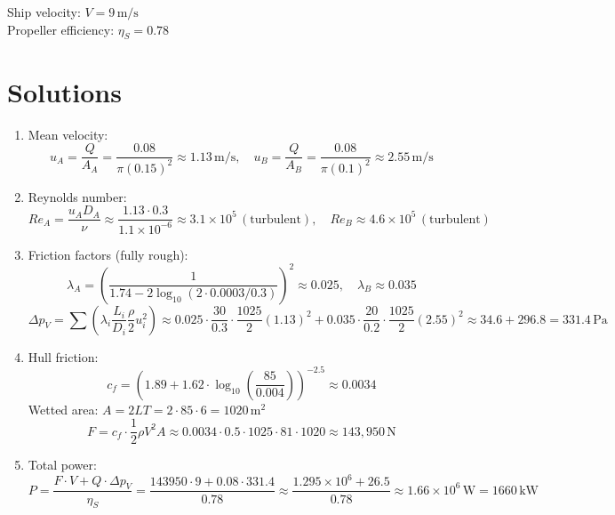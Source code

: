 \documentclass[12pt,a4paper]{article}
\begin{document}
Ship velocity: $V = 9\,\mathrm{m/s}$ \\
Propeller efficiency: $\eta_S = 0.78$

\section*{Solutions}
\begin{enumerate}[label=\alph*)]
    \item Mean velocity:
    \[
    u_A = \frac{Q}{A_A} = \frac{0.08}{\pi (0.15)^2} \approx 1.13 \, \mathrm{m/s}, \quad
    u_B = \frac{Q}{A_B} = \frac{0.08}{\pi (0.1)^2} \approx 2.55 \, \mathrm{m/s}
    \]

    \item Reynolds number:
    \[
    Re_A = \frac{u_A D_A}{\nu} \approx \frac{1.13 \cdot 0.3}{1.1 \times 10^{-6}} \approx 3.1 \times 10^5 \, (\text{turbulent}),
    \quad Re_B \approx 4.6 \times 10^5 \, (\text{turbulent})
    \]

    \item Friction factors (fully rough):
    \[
    \lambda_A = \left(\frac{1}{1.74 - 2 \log_{10}(2 \cdot 0.0003 / 0.3)}\right)^2 \approx 0.025,
    \quad \lambda_B \approx 0.035
    \]
    \[
    \Delta p_V = \sum \left( \lambda_i \frac{L_i}{D_i} \frac{\rho}{2} u_i^2 \right) \approx 0.025 \cdot \frac{30}{0.3} \cdot \frac{1025}{2} (1.13)^2 + 0.035 \cdot \frac{20}{0.2} \cdot \frac{1025}{2} (2.55)^2 \approx 34.6 + 296.8 = 331.4 \, \mathrm{Pa}
    \]

    \item Hull friction:
    \[
    c_f = \left(1.89 + 1.62 \cdot \log_{10}\left(\frac{85}{0.004}\right)\right)^{-2.5} \approx 0.0034
    \]
    Wetted area: $A = 2LT = 2 \cdot 85 \cdot 6 = 1020 \, \mathrm{m^2}$
    \[
    F = c_f \cdot \frac{1}{2} \rho V^2 A \approx 0.0034 \cdot 0.5 \cdot 1025 \cdot 81 \cdot 1020 \approx 143{,}950 \, \mathrm{N}
    \]

    \item Total power:
    \[
    P = \frac{F \cdot V + Q \cdot \Delta p_V}{\eta_S} = \frac{143950 \cdot 9 + 0.08 \cdot 331.4}{0.78} \approx \frac{1.295 \times 10^6 + 26.5}{0.78} \approx 1.66 \times 10^6 \, \mathrm{W} = 1660 \, \mathrm{kW}
    \]
\end{enumerate}
\end{document}
